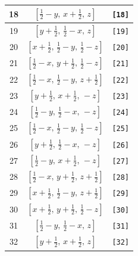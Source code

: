 \documentclass[fleqn,8pt]{jsarticle}
\begin{document}
\begin{longtable}{ccc}
18 & $\left[ \frac{1}{2} - y,\, x + \frac{1}{2},\, z \right]$ & {\tt [18]} \\ \hline
19 & $\left[ y + \frac{1}{2},\, \frac{1}{2} - x,\, z \right]$ & {\tt [19]} \\ \hline
20 & $\left[ x + \frac{1}{2},\, \frac{1}{2} - y,\, \frac{1}{2} - z \right]$ & {\tt [20]} \\ \hline
21 & $\left[ \frac{1}{2} - x,\, y + \frac{1}{2},\, \frac{1}{2} - z \right]$ & {\tt [21]} \\ \hline
22 & $\left[ \frac{1}{2} - x,\, \frac{1}{2} - y,\, z + \frac{1}{2} \right]$ & {\tt [22]} \\ \hline
23 & $\left[ y + \frac{1}{2},\, x + \frac{1}{2},\, - z \right]$ & {\tt [23]} \\ \hline
24 & $\left[ \frac{1}{2} - y,\, \frac{1}{2} - x,\, - z \right]$ & {\tt [24]} \\ \hline
25 & $\left[ \frac{1}{2} - x,\, \frac{1}{2} - y,\, \frac{1}{2} - z \right]$ & {\tt [25]} \\ \hline
26 & $\left[ y + \frac{1}{2},\, \frac{1}{2} - x,\, - z \right]$ & {\tt [26]} \\ \hline
27 & $\left[ \frac{1}{2} - y,\, x + \frac{1}{2},\, - z \right]$ & {\tt [27]} \\ \hline
28 & $\left[ \frac{1}{2} - x,\, y + \frac{1}{2},\, z + \frac{1}{2} \right]$ & {\tt [28]} \\ \hline
29 & $\left[ x + \frac{1}{2},\, \frac{1}{2} - y,\, z + \frac{1}{2} \right]$ & {\tt [29]} \\ \hline
30 & $\left[ x + \frac{1}{2},\, y + \frac{1}{2},\, \frac{1}{2} - z \right]$ & {\tt [30]} \\ \hline
31 & $\left[ \frac{1}{2} - y,\, \frac{1}{2} - x,\, z \right]$ & {\tt [31]} \\ \hline
32 & $\left[ y + \frac{1}{2},\, x + \frac{1}{2},\, z \right]$ & {\tt [32]} \\
\end{longtable}
\end{document}
